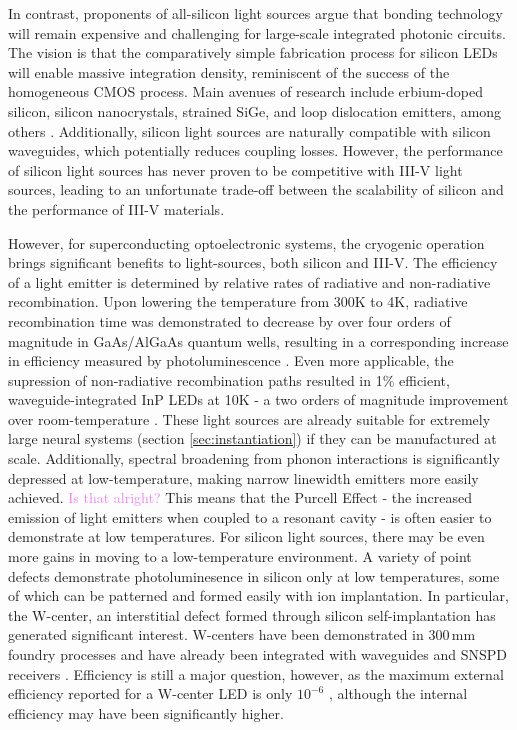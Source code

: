 \documentclass[twocolumn]{article}
\begin{document}
In contrast, proponents of all-silicon light sources argue that bonding technology will remain expensive and challenging for large-scale integrated photonic circuits. The vision is that the comparatively simple fabrication process for silicon LEDs will enable massive integration density, reminiscent of the success of the homogeneous CMOS process. Main avenues of research include erbium-doped silicon, silicon nanocrystals, strained SiGe, and loop dislocation emitters, among others \cite{pavesi2008silicon}. Additionally, silicon light sources are naturally compatible with silicon waveguides, which potentially reduces coupling losses. However, the performance of silicon light sources has never proven to be competitive with III-V light sources, leading to an unfortunate trade-off between the scalability of silicon and the performance of III-V materials.

However, for superconducting optoelectronic systems, the cryogenic operation brings significant benefits to light-sources, both silicon and III-V. The efficiency of a light emitter is determined by relative rates of radiative and non-radiative recombination. Upon lowering the temperature from 300K to 4K, radiative recombination time was demonstrated to decrease by over four orders of magnitude in GaAs/AlGaAs quantum wells, resulting in a corresponding increase in efficiency measured by photoluminescence \cite{gurioli1991temperature}. Even more applicable, the supression of non-radiative recombination paths resulted in 1\% efficient, waveguide-integrated InP LEDs at 10K - a two orders of magnitude improvement over room-temperature \cite{dolores2017waveguide}. These light sources are already suitable for extremely large neural systems (section \ref{sec:instantiation}) if they can be manufactured at scale. Additionally, spectral broadening from phonon interactions is significantly depressed at low-temperature, making narrow linewidth emitters more easily achieved. \textcolor{Violet}{Is that alright?} This means that the Purcell Effect - the increased emission of light emitters when coupled to a resonant cavity - is often easier to demonstrate at low temperatures. For silicon light sources, there may be even more gains in moving to a low-temperature environment. A variety of point defects demonstrate photoluminesence in silicon only at low temperatures, some of which can be patterned and formed easily with ion implantation. In particular, the W-center, an interstitial defect formed through silicon self-implantation has generated significant interest. W-centers have been demonstrated in 300\,mm foundry processes \cite{buckley2020optimization} and have already been integrated with waveguides and SNSPD receivers \cite{buckley2020optimization}. Efficiency is still a major question, however, as the maximum external efficiency reported for a W-center LED is only $10^{-6}$ \cite{bao2007point}, although the internal efficiency may have been significantly higher.
\end{document}
